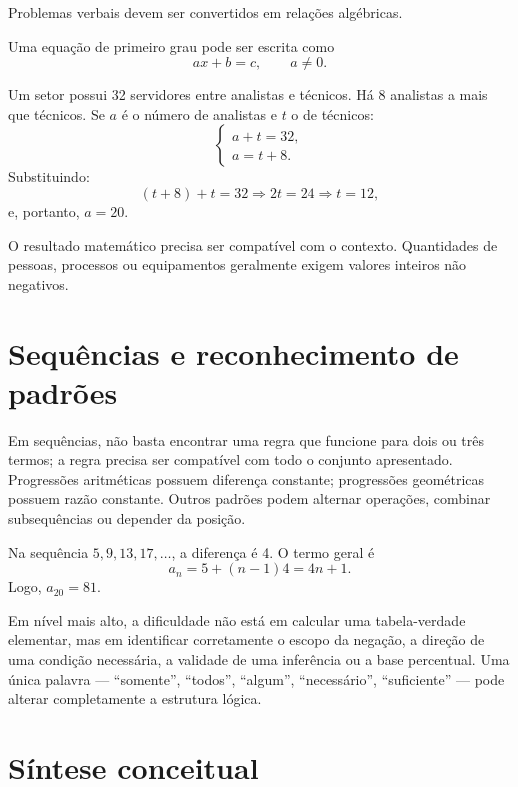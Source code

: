 Problemas verbais devem ser convertidos em relações algébricas.

Uma equação de primeiro grau pode ser escrita como
\[
ax+b=c,\qquad a\neq0.
\]

\begin{exemplo}[modelagem]
Um setor possui 32 servidores entre analistas e técnicos. Há 8 analistas a mais que técnicos. Se $a$ é o número de analistas e $t$ o de técnicos:
\[
\begin{cases}
a+t=32,\\
a=t+8.
\end{cases}
\]
Substituindo:
\[
(t+8)+t=32\Rightarrow2t=24\Rightarrow t=12,
\]
e, portanto, $a=20$.
\end{exemplo}

O resultado matemático precisa ser compatível com o contexto. Quantidades de pessoas, processos ou equipamentos geralmente exigem valores inteiros não negativos.

\section{Sequências e reconhecimento de padrões}

Em sequências, não basta encontrar uma regra que funcione para dois ou três termos; a regra precisa ser compatível com todo o conjunto apresentado. Progressões aritméticas possuem diferença constante; progressões geométricas possuem razão constante. Outros padrões podem alternar operações, combinar subsequências ou depender da posição.

\begin{exemplo}
Na sequência $5,9,13,17,\ldots$, a diferença é 4. O termo geral é
\[
a_n=5+(n-1)4=4n+1.
\]
Logo, $a_{20}=81$.
\end{exemplo}

\begin{cebraspe}
Em nível mais alto, a dificuldade não está em calcular uma tabela-verdade elementar, mas em identificar corretamente o escopo da negação, a direção de uma condição necessária, a validade de uma inferência ou a base percentual. Uma única palavra — ``somente'', ``todos'', ``algum'', ``necessário'', ``suficiente'' — pode alterar completamente a estrutura lógica.
\end{cebraspe}

\section{Síntese conceitual}

